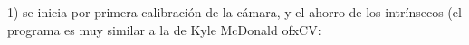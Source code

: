 1) se inicia por primera calibración de la cámara, y el ahorro de los intrínsecos (el programa es muy similar a la de Kyle McDonald ofxCV: 



                

                





